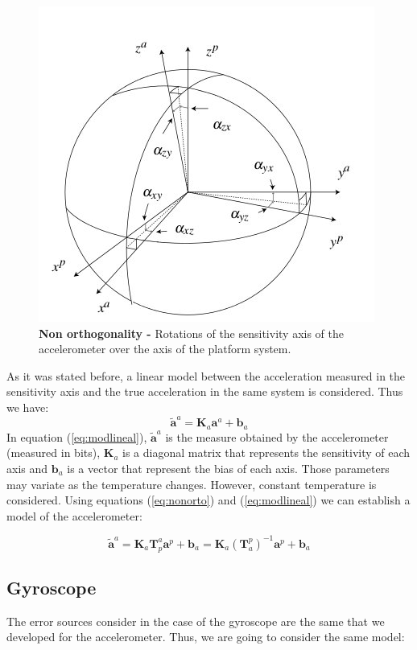 \documentclass[conference]{IEEEtran}
\newcommand{\refp}[1]{(\ref{#1})}
\begin{document}
\begin{figure}
	\centering
	\includegraphics[width=.6\columnwidth]{./pics_paper/ejes_acc.jpg}
	\caption{\textbf{Non orthogonality -} Rotations of the sensitivity axis of the accelerometer over the axis of the platform system.}
	\label{fig:nonorto}
\end{figure}

As it was stated before, a linear model between the acceleration measured in the sensitivity axis and the true acceleration in the same system is considered. Thus we have:
\begin{equation}
\tilde{\mathbf{a}}^a = \mathbf{K}_a\mathbf{a}^a + \mathbf{b}_a
\label{eq:modlineal}
\end{equation}
In equation \refp{eq:modlineal}, $\tilde{\mathbf{a}}^a$ is the measure obtained by the accelerometer (measured in bits), $\mathbf{K}_a$ is a diagonal matrix that represents the sensitivity of each axis and $\mathbf{b}_a$ is a vector that represent the bias of each axis. Those parameters may variate as the temperature changes. However, constant temperature is considered. Using equations \refp{eq:nonorto} and \refp{eq:modlineal} we can establish a model of the accelerometer:

\begin{equation}
\tilde{\mathbf{a}}^a = \mathbf{K}_a\mathbf{T}_p^a\mathbf{a}^p + \mathbf{b}_a = \mathbf{K}_a(\mathbf{T}_a^p)^{-1}\mathbf{a}^p + \mathbf{b}_a 
\end{equation}


\subsection{Gyroscope}
The error sources consider in the case of the gyroscope are the same that we developed for the accelerometer. Thus, we are going to consider the same model:
\end{document}
